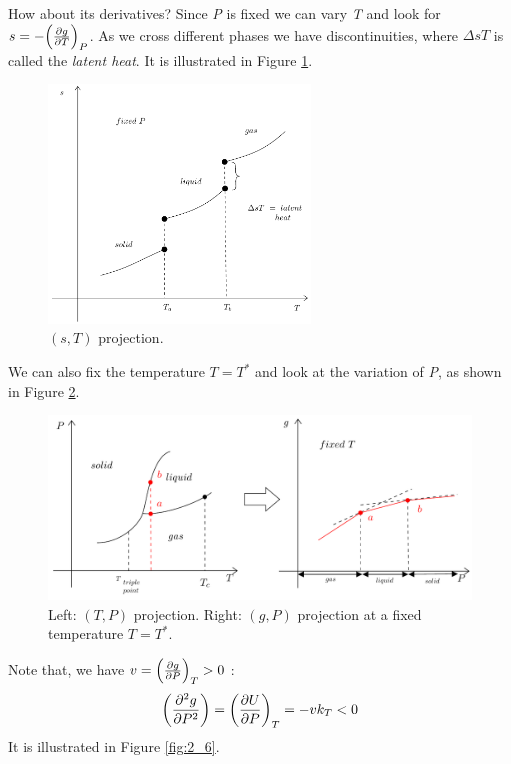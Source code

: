 \documentclass[../main/main.tex]{subfiles}
\begin{document}
\noindent
How about its derivatives? Since \emph{P}  is fixed we can vary \emph{T}  and look for \( s=-\qty(\pdv{g}{T} )_P  \). As we cross different phases  we have discontinuities, where \( \Delta s T \)  is called the \emph{latent heat}. It is illustrated in Figure \ref{fig:2_4}.



\begin{figure}[h!]
\centering
\includegraphics[width=0.62\textwidth]{../lessons/2_image/4.pdf}
\caption{\label{fig:2_4} \( (s,T) \) projection. }
\end{figure}


We can also fix the temperature \( T=T^* \)  and look at the variation of \emph{P}, as shown in Figure \ref{fig:2_5}.

\begin{figure}[h!]
\centering
\includegraphics[width=1\textwidth]{../lessons/2_image/5.pdf}
\caption{\label{fig:2_5} Left: \( (T,P) \) projection. Right:  \( (g,P) \) projection at a fixed temperature \( T = T^* \).}
\end{figure}

\noindent
Note that, we have  \( v= \qty(\pdv{g}{P} )_T > 0  \) :
\begin{equation}
  \qty(\pdv[2]{g}{P} ) = \qty(\pdv{U}{P} )_T = -v k_T < 0
  \label{eq:}
\end{equation}
It is illustrated in Figure \ref{fig:2_6}.
\end{document}

